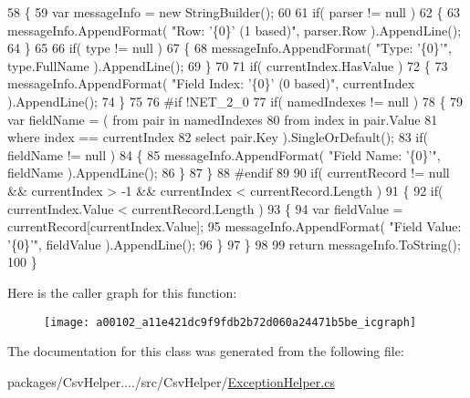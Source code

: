 \begin{DoxyCode}
58         \{
59             var messageInfo = \textcolor{keyword}{new} StringBuilder();
60 
61             \textcolor{keywordflow}{if}( parser != null )
62             \{
63                 messageInfo.AppendFormat( \textcolor{stringliteral}{"Row: '\{0\}' (1 based)"}, parser.Row ).AppendLine();
64             \}
65 
66             \textcolor{keywordflow}{if}( type != null )
67             \{
68                 messageInfo.AppendFormat( \textcolor{stringliteral}{"Type: '\{0\}'"}, type.FullName ).AppendLine();
69             \}
70 
71             \textcolor{keywordflow}{if}( currentIndex.HasValue )
72             \{
73                 messageInfo.AppendFormat( \textcolor{stringliteral}{"Field Index: '\{0\}' (0 based)"}, currentIndex ).AppendLine();
74             \}
75 
76 \textcolor{preprocessor}{#if !NET\_2\_0
}
77 \textcolor{preprocessor}{}            \textcolor{keywordflow}{if}( namedIndexes != null )
78             \{
79                 var fieldName = ( from pair in namedIndexes
80                                   from index in pair.Value
81                                   where index == currentIndex
82                                   select pair.Key ).SingleOrDefault();
83                 \textcolor{keywordflow}{if}( fieldName != null )
84                 \{
85                     messageInfo.AppendFormat( \textcolor{stringliteral}{"Field Name: '\{0\}'"}, fieldName ).AppendLine();
86                 \}
87             \}
88 \textcolor{preprocessor}{#endif
}
89 \textcolor{preprocessor}{}
90             \textcolor{keywordflow}{if}( currentRecord != null && currentIndex > -1 && currentIndex < currentRecord.Length )
91             \{
92                 \textcolor{keywordflow}{if}( currentIndex.Value < currentRecord.Length )
93                 \{
94                     var fieldValue = currentRecord[currentIndex.Value];
95                     messageInfo.AppendFormat( \textcolor{stringliteral}{"Field Value: '\{0\}'"}, fieldValue ).AppendLine();
96                 \}
97             \}
98 
99             \textcolor{keywordflow}{return} messageInfo.ToString();
100         \}
\end{DoxyCode}


Here is the caller graph for this function\-:
\nopagebreak
\begin{figure}[H]
\begin{center}
\leavevmode
\texttt{[image: a00102\_a11e421dc9f9fdb2b72d060a24471b5be\_icgraph]}
\end{center}
\end{figure}




The documentation for this class was generated from the following file\-:\begin{DoxyCompactItemize}
\item 
packages/\-Csv\-Helper..../src/\-Csv\-Helper/\hyperlink{a00244}{Exception\-Helper.\-cs}\end{DoxyCompactItemize}
